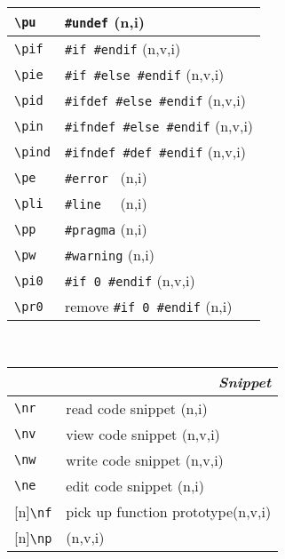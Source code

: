 \documentclass[oneside,11pt,landscape,DIV16]{scrartcl}
\newcommand{\Rep}{{\tiny{[n]}}}
\begin{document}
\begin{multicols}{3}
\begin{center}
\begin{tabular}[]{|p{15mm}|p{55mm}|}
\hline \verb'\pu'   & \verb'#undef'                \hfill (n,i)\\
\hline \verb'\pif'  & \verb'#if #endif'            \hfill (n,v,i)\\
\hline \verb'\pie'  & \verb'#if #else #endif'      \hfill (n,v,i)\\
\hline \verb'\pid'  & \verb'#ifdef #else #endif'   \hfill (n,v,i)\\
\hline \verb'\pin'  & \verb'#ifndef #else #endif'  \hfill (n,v,i)\\
\hline \verb'\pind' & \verb'#ifndef #def #endif'   \hfill (n,v,i)\\
\hline \verb'\pe'   & \verb'#error '               \hfill (n,i)\\
\hline \verb'\pli'  & \verb'#line  '               \hfill (n,i)\\
\hline \verb'\pp'   & \verb'#pragma'               \hfill (n,i)\\
\hline \verb'\pw'   & \verb'#warning'              \hfill (n,i)\\
\hline \verb'\pi0'  & \verb'#if 0 #endif'          \hfill (n,v,i)\\
\hline \verb'\pr0'  & remove \verb'#if 0 #endif'   \hfill (n,i)\\
\hline
\end{tabular} \\
%
%
\begin{tabular}[]{|p{11mm}|p{60mm}|}%
\hline 
\multicolumn{2}{|r|}{\textsl{S\textbf{n}ippet}} \\
\hline     \verb'\nr'  & read code snippet         \hfill (n,i)\\
\hline     \verb'\nv'  & view code snippet         \hfill (n,v,i)\\
\hline     \verb'\nw'  & write code snippet        \hfill (n,v,i)\\
\hline     \verb'\ne'  & edit code snippet         \hfill (n,i)\\
\hline \Rep\verb'\nf'  & pick up function prototype\hfill (n,v,i)\\
       \Rep\verb'\np'  &                           \hfill (n,v,i)\\

\end{tabular}
\end{center}
\end{multicols}
\end{document}
